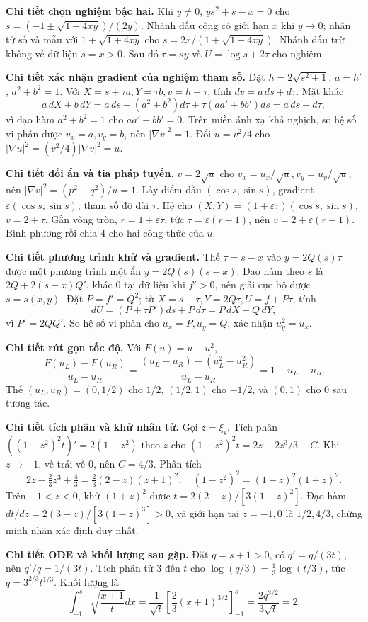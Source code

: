 \textbf{Chi tiết chọn nghiệm bậc hai.} Khi $y\ne0$, $ys^2+s-x=0$ cho $s=(-1\pm\sqrt{1+4xy})/(2y)$. Nhánh dấu cộng có giới hạn $x$ khi $y\to0$; nhân tử số và mẫu với $1+\sqrt{1+4xy}$ cho $s=2x/(1+\sqrt{1+4xy})$. Nhánh dấu trừ không về dữ liệu $s=x>0$. Sau đó $\tau=sy$ và $U=\log s+2\tau$ cho nghiệm.

\textbf{Chi tiết xác nhận gradient của nghiệm tham số.} Đặt $h=2\sqrt{s^2+1}$, $a=h'$, $a^2+b^2=1$. Với $X=s+\tau a,Y=\tau b,v=h+\tau$, tính $dv=a\,ds+d\tau$. Mặt khác
\[a\,dX+b\,dY=a\,ds+(a^2+b^2)d\tau+\tau(aa'+bb')ds=a\,ds+d\tau,\]
vì đạo hàm $a^2+b^2=1$ cho $aa'+bb'=0$. Trên miền ánh xạ khả nghịch, so hệ số vi phân được $v_x=a,v_y=b$, nên $|\nabla v|^2=1$. Đổi $u=v^2/4$ cho $|\nabla u|^2=(v^2/4)|\nabla v|^2=u$.

\textbf{Chi tiết đổi ẩn và tia pháp tuyến.} $v=2\sqrt u$ cho $v_x=u_x/\sqrt u,v_y=u_y/\sqrt u$, nên $|\nabla v|^2=(p^2+q^2)/u=1$. Lấy điểm đầu $(\cos s,\sin s)$, gradient $\varepsilon(\cos s,\sin s)$, tham số độ dài $\tau$. Hệ cho $(X,Y)=(1+\varepsilon\tau)(\cos s,\sin s)$, $v=2+\tau$. Gần vòng tròn, $r=1+\varepsilon\tau$, tức $\tau=\varepsilon(r-1)$, nên $v=2+\varepsilon(r-1)$. Bình phương rồi chia $4$ cho hai công thức của $u$.

\textbf{Chi tiết phương trình khử và gradient.} Thế $\tau=s-x$ vào $y=2Q(s)\tau$ được một phương trình một ẩn $y=2Q(s)(s-x)$. Đạo hàm theo $s$ là $2Q+2(s-x)Q'$, khác $0$ tại dữ liệu khi $f'>0$, nên giải cục bộ được $s=s(x,y)$. Đặt $P=f'=Q^2$; từ $X=s-\tau,Y=2Q\tau,U=f+P\tau$, tính
\[dU=(P+\tau P')ds+P\,d\tau=P\,dX+Q\,dY,\]
vì $P'=2QQ'$. So hệ số vi phân cho $u_x=P,u_y=Q$, xác nhận $u_y^2=u_x$.

\textbf{Chi tiết rút gọn tốc độ.} Với $F(u)=u-u^2$,
\[\frac{F(u_L)-F(u_R)}{u_L-u_R}
=\frac{(u_L-u_R)-(u_L^2-u_R^2)}{u_L-u_R}
=1-u_L-u_R.\]
Thế $(u_L,u_R)=(0,1/2)$ cho $1/2$, $(1/2,1)$ cho $-1/2$, và $(0,1)$ cho $0$ sau tương tác.

\textbf{Chi tiết tích phân và khử nhân tử.} Gọi $z=\xi_s$. Tích phân $( (1-z^2)^2t)'=2(1-z^2)$ theo $z$ cho $(1-z^2)^2t=2z-2z^3/3+C$. Khi $z\to-1$, vế trái về $0$, nên $C=4/3$. Phân tích
\[2z-\tfrac23z^3+\tfrac43=\tfrac23(2-z)(z+1)^2,\quad
(1-z^2)^2=(1-z)^2(1+z)^2.\]
Trên $-1<z<0$, khử $(1+z)^2$ được $t=2(2-z)/[3(1-z)^2]$. Đạo hàm $dt/dz=2(3-z)/[3(1-z)^3]>0$, và giới hạn tại $z=-1,0$ là $1/2,4/3$, chứng minh nhãn xác định duy nhất.

\textbf{Chi tiết ODE và khối lượng sau gặp.} Đặt $q=s+1>0$, có $q'=q/(3t)$, nên $q'/q=1/(3t)$. Tích phân từ $3$ đến $t$ cho $\log(q/3)=\frac13\log(t/3)$, tức $q=3^{2/3}t^{1/3}$. Khối lượng là
\[\int_{-1}^{s}\sqrt{\frac{x+1}{t}}dx
=\frac1{\sqrt t}\left[\frac23(x+1)^{3/2}\right]_{-1}^{s}
=\frac{2q^{3/2}}{3\sqrt t}=2.\]


